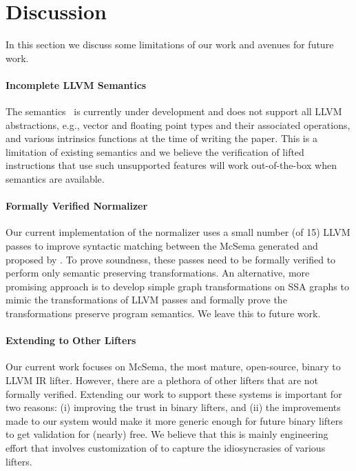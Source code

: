 \section{Discussion}\label{sec:discussion}

In this section we discuss some limitations of our work and avenues for future
work.

\paragraph{Incomplete LLVM Semantics} The \LLVM semantics~\cite{LLVMSEMA} is
currently under development and does not support all LLVM abstractions, e.g.,
vector and floating point types and their associated operations, and various
intrinsics functions at the time of writing the paper. This is a limitation of
existing semantics and we believe the verification of lifted instructions that
use such unsupported features will work out-of-the-box when semantics are
available.

\paragraph{Formally Verified Normalizer} Our current implementation of the
normalizer uses a small number (of 15) LLVM passes to improve syntactic
matching between the McSema generated  and  proposed by
\compd. To prove soundness, these passes need to be formally verified to
perform only semantic preserving transformations. An alternative, more
promising approach is to develop simple graph transformations on SSA graphs to
mimic the transformations of LLVM passes and formally prove the
transformations preserve program semantics. We leave this to future work.

\paragraph{Extending to Other Lifters} Our current work focuses on McSema, the
most mature, open-source, binary to LLVM IR lifter. However, there are a
plethora of other lifters that are not formally verified. Extending our work
to support these systems is important for two reasons: (i) improving the
trust in binary lifters, and (ii) the improvements made to our system would
make it more generic enough for future binary lifters to get validation for
(nearly) free. We believe that this is mainly engineering effort that involves
customization of \compd to capture the idiosyncrasies of various lifters.

